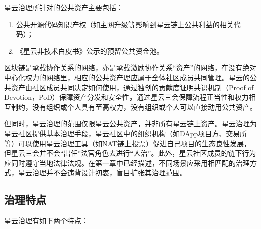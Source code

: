 星云治理所针对的公共资产主要包括：

\begin{enumerate}
	\item 公共开源代码知识产权（如主网升级等影响到星云链上公共利益的相关代码）；
	\item 《星云非技术白皮书》公示的预留公共资金池。
\end{enumerate}

区块链是承载协作关系的网络，亦是承载激励协作关系“资产”的网络，在没有绝对中心化权力的网络里，相应的公共资产理应属于全体社区成员共同管理。星云的公共资产由社区成员共同决定如何使用，通过独创的贡献度证明共识机制（Proof of Devotion，PoD）保障资产分发和安全性，通过星云三会保障流程正当性和权力相互制约，没有组织或个人具有至高权力，没有组织或个人可以直接动用公共资产。

但同时，星云治理的范围仅限星云公共资产，并非所有星云链上资产。星云治理为星云社区提供基本治理手段，星云社区中的组织机构（如DApp项目方、交易所等）可以使用星云治理工具（如NAT链上投票）促进自己项目的生态良性发展，但星云三会并不会“出任”法官角色去进行“人治”。此外，星云社区成员的链下行为应同时遵守当地法律法规。在第一章中已经描述，不同场景应采用相匹配的治理方式，星云治理并不会违背设计初衷，盲目扩张其治理范围。

\subsection{治理特点}

星云治理有如下两个特点：

